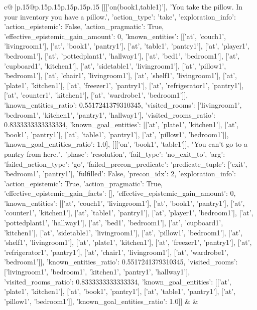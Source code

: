 \documentclass{article}
\begin{document}
{\begin{supertabular}{c@{$\;$}|p{.15\linewidth}@{}p{.15\linewidth}p{.15\linewidth}p{.15\linewidth}p{.15\linewidth}p{.15\linewidth}}
{{{	 [[['on(book1,table1)'], 'You take the pillow. In your inventory you have a pillow.', {'action_type': 'take', 'exploration_info': {'action_epistemic': False, 'action_pragmatic': True, 'effective_epistemic_gain_amount': 0, 'known_entities': [['at', 'couch1', 'livingroom1'], ['at', 'book1', 'pantry1'], ['at', 'table1', 'pantry1'], ['at', 'player1', 'bedroom1'], ['at', 'pottedplant1', 'hallway1'], ['at', 'bed1', 'bedroom1'], ['at', 'cupboard1', 'kitchen1'], ['at', 'sidetable1', 'livingroom1'], ['at', 'pillow1', 'bedroom1'], ['at', 'chair1', 'livingroom1'], ['at', 'shelf1', 'livingroom1'], ['at', 'plate1', 'kitchen1'], ['at', 'freezer1', 'pantry1'], ['at', 'refrigerator1', 'pantry1'], ['at', 'counter1', 'kitchen1'], ['at', 'wardrobe1', 'bedroom1']], 'known_entities_ratio': 0.5517241379310345, 'visited_rooms': ['livingroom1', 'bedroom1', 'kitchen1', 'pantry1', 'hallway1'], 'visited_rooms_ratio': 0.8333333333333334, 'known_goal_entities': [['at', 'plate1', 'kitchen1'], ['at', 'book1', 'pantry1'], ['at', 'table1', 'pantry1'], ['at', 'pillow1', 'bedroom1']], 'known_goal_entities_ratio': 1.0}}], [[['on', 'book1', 'table1']], "You can't go to a pantry from here.", {'phase': 'resolution', 'fail_type': 'no_exit_to', 'arg': {'failed_action_type': 'go', 'failed_precon_predicate': {'predicate_tuple': ['exit', 'bedroom1', 'pantry1'], 'fulfilled': False, 'precon_idx': 2}}, 'exploration_info': {'action_epistemic': True, 'action_pragmatic': True, 'effective_epistemic_gain_facts': [], 'effective_epistemic_gain_amount': 0, 'known_entities': [['at', 'couch1', 'livingroom1'], ['at', 'book1', 'pantry1'], ['at', 'counter1', 'kitchen1'], ['at', 'table1', 'pantry1'], ['at', 'player1', 'bedroom1'], ['at', 'pottedplant1', 'hallway1'], ['at', 'bed1', 'bedroom1'], ['at', 'cupboard1', 'kitchen1'], ['at', 'sidetable1', 'livingroom1'], ['at', 'pillow1', 'bedroom1'], ['at', 'shelf1', 'livingroom1'], ['at', 'plate1', 'kitchen1'], ['at', 'freezer1', 'pantry1'], ['at', 'refrigerator1', 'pantry1'], ['at', 'chair1', 'livingroom1'], ['at', 'wardrobe1', 'bedroom1']], 'known_entities_ratio': 0.5517241379310345, 'visited_rooms': ['livingroom1', 'bedroom1', 'kitchen1', 'pantry1', 'hallway1'], 'visited_rooms_ratio': 0.8333333333333334, 'known_goal_entities': [['at', 'plate1', 'kitchen1'], ['at', 'book1', 'pantry1'], ['at', 'table1', 'pantry1'], ['at', 'pillow1', 'bedroom1']], 'known_goal_entities_ratio': 1.0}}]] 
	  } 
	   } 
	   } 
	 & & \\ 
 

    \theutterance {}  


\end{supertabular}}
\end{document}
